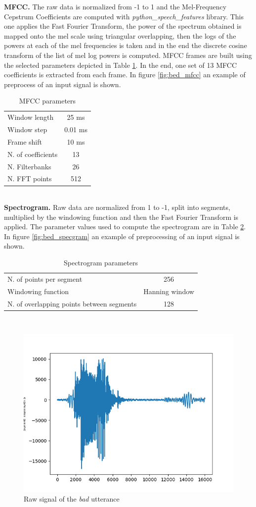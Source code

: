 \noindent \textbf{MFCC.} The raw data is normalized from -1 to 1 and the Mel-Frequency Cepstrum Coefficients are computed with \textit{python\_speech\_features} library. This one applies the Fast Fourier Transform, the power of the spectrum obtained is mapped onto the mel scale using triangular overlapping, then the logs of the powers at each of the mel frequencies is taken and in the end the discrete cosine transform of the list of mel log powers is computed. MFCC frames are built using the selected parameters depicted in Table \ref{table:mfcc_parameters}.
\noindent In the end, one set of 13 MFCC coefficients is extracted from each frame. In figure \ref{fig:bed_mfcc} an example of preprocess of an input signal is shown.
\begin{table}[h]
	\centering
	\begin{tabular}{ |l|c|}
		\hline
		Window length & 25 ms        \\
		Window step & 0.01 ms        \\
		Frame shift  & 10 ms         \\
		N. of coefficients & 13 \\
		N. Filterbanks & 26         \\
		N. FFT points & 512         \\
		\hline
	\end{tabular}
	\caption{MFCC parameters}
	\label{table:mfcc_parameters} 
\end{table}\\
\noindent \textbf{Spectrogram.} Raw data are normalized from 1 to -1, split into segments, multiplied by the windowing function and then the Fast Fourier Transform is applied.
The parameter values used to compute the spectrogram are in Table \ref{table:specgram_parameters}. In figure \ref{fig:bed_specgram} an example of preprocessing of an input signal is shown.
\begin{table}[h]
	\centering
	\begin{tabular}{ |l|c| }
		\hline
		N. of points per segment & 256 \\
		Windowing function & Hanning window \\
		N. of overlapping points between segments & 128 \\
		\hline
	\end{tabular}
	\caption{Spectrogram parameters}
	\label{table:specgram_parameters} 
\end{table}\\

\begin{figure}
	\centering
	\includegraphics[width=.5\textwidth]{img/bed_rawsignal_plot.png}
	\caption{Raw signal of the \textit{bad} utterance}
	\label{fig:bed_rawsignal}
\end{figure}


